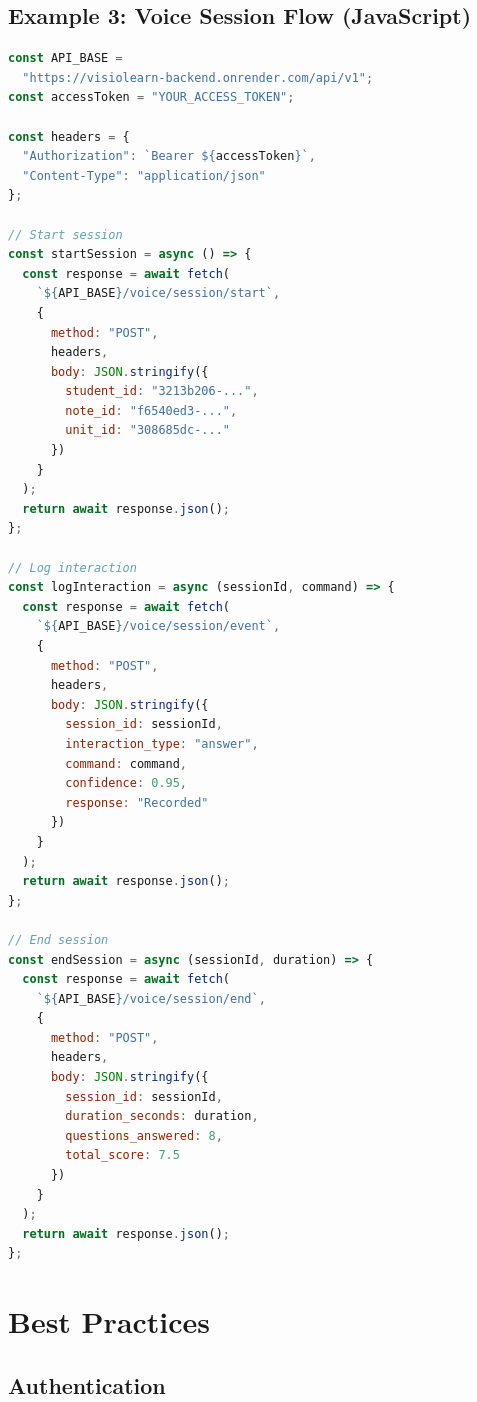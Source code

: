 \documentclass[12pt,a4paper,oneside]{article}
\begin{document}
\subsection{Example 3: Voice Session Flow (JavaScript)}

\begin{lstlisting}[language=javascript]
const API_BASE = 
  "https://visiolearn-backend.onrender.com/api/v1";
const accessToken = "YOUR_ACCESS_TOKEN";

const headers = {
  "Authorization": `Bearer ${accessToken}`,
  "Content-Type": "application/json"
};

// Start session
const startSession = async () => {
  const response = await fetch(
    `${API_BASE}/voice/session/start`,
    {
      method: "POST",
      headers,
      body: JSON.stringify({
        student_id: "3213b206-...",
        note_id: "f6540ed3-...",
        unit_id: "308685dc-..."
      })
    }
  );
  return await response.json();
};

// Log interaction
const logInteraction = async (sessionId, command) => {
  const response = await fetch(
    `${API_BASE}/voice/session/event`,
    {
      method: "POST",
      headers,
      body: JSON.stringify({
        session_id: sessionId,
        interaction_type: "answer",
        command: command,
        confidence: 0.95,
        response: "Recorded"
      })
    }
  );
  return await response.json();
};

// End session
const endSession = async (sessionId, duration) => {
  const response = await fetch(
    `${API_BASE}/voice/session/end`,
    {
      method: "POST",
      headers,
      body: JSON.stringify({
        session_id: sessionId,
        duration_seconds: duration,
        questions_answered: 8,
        total_score: 7.5
      })
    }
  );
  return await response.json();
};
\end{lstlisting}

\section{Best Practices}

\subsection{Authentication}
\end{document}
